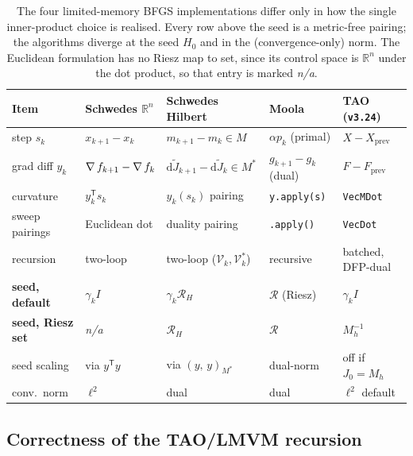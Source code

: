 \documentclass[a4paper,11pt]{article}
\newcommand{\R}{\mathbb{R}}
\newcommand{\inner}[3]{(#1,\,#2)_{#3}}        %
\newcommand{\Rmap}{\mathcal{R}}              %
\newcommand{\Jt}{\tilde{J}}                  %
\newcommand{\Mspace}{M}
\theoremstyle{spacedplain} \newtheorem{theorem}[counter]{Theorem} \newtheorem{lemma}[counter]{Lemma} \newtheorem{prop}[counter]{Proposition} \newtheorem{cor}[counter]{Corollary}
\theoremstyle{spaceddefinition} \newtheorem{defn}[counter]{Definition} \newtheorem{example}[counter]{Example} \newtheorem{remark}[counter]{Remark}
\begin{document}
\begin{table}[H]
  \centering \scriptsize
  \setlength{\tabcolsep}{3.5pt}
  \renewcommand{\arraystretch}{1.25}
  \begin{tabular}{@{}l p{2.4cm} p{2.9cm} p{2.5cm} p{2.7cm}@{}}
    \toprule
    Item & Schwedes $\R^{n}$ & Schwedes Hilbert & Moola & TAO (\texttt{v3.24}) \\
    \midrule
    step $s_k$ & $x_{k+1}-x_k$ & $m_{k+1}-m_k\in\Mspace$ & $\alpha p_k$ (primal) & $X-X_{\mathrm{prev}}$ \\
    grad diff $y_k$ & $\operatorname{\nabla} f_{k+1}-\operatorname{\nabla} f_k$ & $\mathrm{d}\Jt_{k+1}-\mathrm{d}\Jt_k\in\Mspace^{*}$ & $g_{k+1}-g_k$ (dual) & $F-F_{\mathrm{prev}}$ \\
    curvature & $y_k^{\mathsf T} s_k$ & $y_k(s_k)$ pairing & \texttt{y.apply(s)} & \texttt{VecMDot} \\
    sweep pairings & Euclidean dot & duality pairing & \texttt{.apply()} & \texttt{VecDot} \\
    recursion & two-loop & two-loop ($\mathcal V_k,\mathcal V_k^{*}$) & recursive & batched, DFP-dual \\
    \textbf{seed, default} & $\gamma_k I$ & $\gamma_k \Rmap_H$ & $\Rmap$ (Riesz) & $\gamma_k I$ \\
    \textbf{seed, Riesz set} & \textit{n/a} & $\Rmap_H$ & $\Rmap$ & $M_h^{-1}$ \\
    seed scaling & via $y^{\mathsf T}y$ & via $\inner{y}{y}{\Mspace^{*}}$ & dual-norm & off if $J_0{=}M_h$ \\
    conv.\ norm & $\ell^{2}$ & dual & dual & $\ell^{2}$ default \\
    \bottomrule
  \end{tabular}
  \caption{The four limited-memory BFGS implementations differ only in how the single inner-product choice is realised. Every row above the seed is a metric-free pairing; the algorithms diverge at the seed $H_0$ and in the (convergence-only) norm. The Euclidean formulation has no Riesz map to set, since its control space is $\R^{n}$ under the dot product, so that entry is marked \textit{n/a}.}
  \label{tab:lbfgs:comparison}
\end{table}

\subsection{Correctness of the TAO/LMVM recursion}
\label{sec:lbfgs:verdict}
\end{document}
